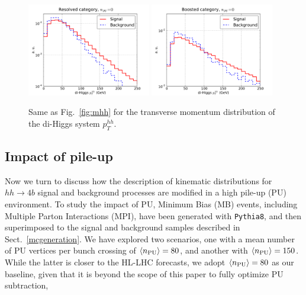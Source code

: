 \begin{figure}[t]
\begin{center}
  \includegraphics[width=0.48\textwidth]{plots/pt_HH_C2_res_noPU.pdf}
  \includegraphics[width=0.48\textwidth]{plots/pt_HH_C2_bst_noPU.pdf}
  \caption{\small Same as Fig.~\ref{fig:mhh} for the transverse momentum
    distribution of the di-Higgs system $p_T^{hh}$.
}
\label{fig:pthh}
\end{center}
\end{figure}


\subsection{Impact of pile-up}
\label{sec:pileup}

Now we turn to discuss how the description of kinematic
distributions for $hh\to 4b$ signal
and background processes are
modified in a high pile-up (PU) environment.
%
To study the impact of PU,
Minimum Bias (MB) events,
including Multiple Parton Interactions (MPI), have been generated
with {\tt Pythia8}, and then
superimposed to the signal
and background samples described in Sect.~\ref{mcgeneration}.
%
We have explored two scenarios,
one with a mean number of
PU vertices per bunch crossing of $\left\langle n_{\rm PU}\right\rangle=80$, and another
with $\left\langle n_{\rm PU}\right\rangle=150$.
%
While the latter is closer to the HL-LHC forecasts,
we adopt $\left\langle n_{\rm PU}\right\rangle=80$ as our baseline,
given that it
is beyond the scope of this paper to fully optimize
PU subtraction,


